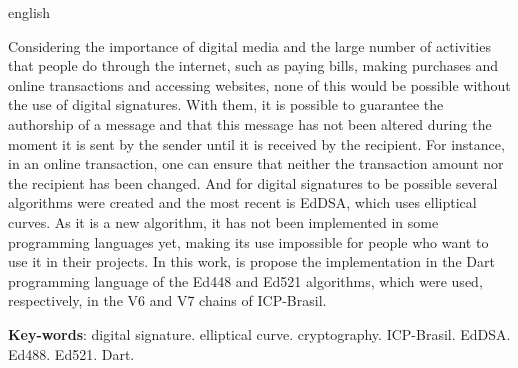 \begin{resumo}[Abstract]
 \begin{otherlanguage*}{english}
   
    Considering the importance of digital media and the large number of activities that people do through the internet, such as paying bills, making purchases and online transactions and accessing websites, none of this would be possible without the use of digital signatures. With them, it is possible to guarantee the authorship of a message and that this message has not been altered during the moment it is sent by the sender until it is received by the recipient. For instance, in an online transaction, one can ensure that neither the transaction amount nor the recipient has been changed. And for digital signatures to be possible several algorithms were created and the most recent is EdDSA, which uses elliptical curves. As it is a new algorithm, it has not been implemented in some programming languages yet, making its use impossible for people who want to use it in their projects. In this work, is propose the implementation in the Dart programming language of the Ed448 and Ed521 algorithms, which were used, respectively, in the V6 and V7 chains of ICP-Brasil.

   \vspace{\onelineskip}
 
   \noindent 
   \textbf{Key-words}: digital signature. elliptical curve. cryptography. ICP-Brasil. EdDSA. Ed488. Ed521. Dart.
 \end{otherlanguage*}
\end{resumo}
